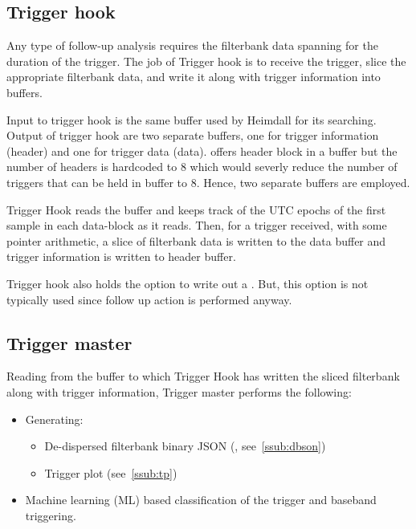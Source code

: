 \subsection {Trigger hook}

\par Any type of follow-up analysis requires the filterbank data spanning for the duration of the trigger. The job of Trigger hook is to receive the \dbson trigger, slice the appropriate filterbank data, and write it along with trigger information into \dada buffers.

\par Input to trigger hook is the same \dada buffer used by Heimdall for its searching. Output of trigger hook are two separate \dada buffers, one for trigger information (header) and one for trigger data (data). 
\dada offers header block in a buffer but the number of headers is hardcoded to $8$ which would severly reduce the number of triggers that can be held in buffer to $8$.  Hence, two separate buffers are employed.

\par Trigger Hook reads the buffer and keeps track of the UTC epochs of the first sample in each data-block as it reads. 
Then, for a trigger received, with some pointer arithmetic, a slice of filterbank data is written to the data \dada buffer and trigger information is written to header \dada buffer.

\par Trigger hook also holds the option to write out a \fbson. But, this option is not typically used since follow up action is performed anyway.

\subsection {Trigger master}

\par Reading from the buffer to which Trigger Hook has written the sliced filterbank along with trigger information, Trigger master performs the following:
\begin{itemize}
	\item Generating: 
		\begin{itemize}
			\item De-dispersed filterbank binary JSON (\dbson, see~\autoref{ssub:dbson})
			\item Trigger plot (see~\autoref{ssub:tp})
		\end{itemize}
	\item Machine learning (ML) based classification of the trigger and baseband triggering.
\end{itemize}

